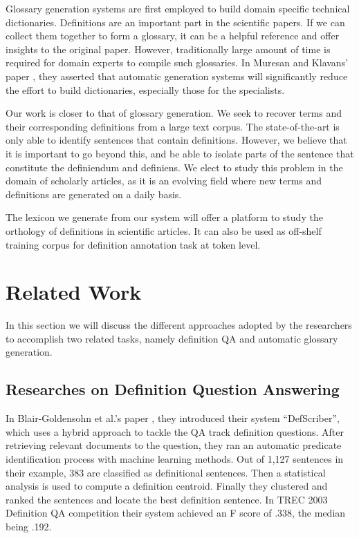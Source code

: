 \documentclass[hyp]{socreport}
\begin{document}
Glossary generation systems are first employed to build domain specific technical dictionaries. Definitions are an important part in the scientific papers. If we can collect them together to form a glossary, it can be a helpful reference and offer insights to the original paper. However, traditionally large amount of time is required for domain experts to compile such glossaries.  In Muresan and Klavans' paper \cite{Muresan02amethod}, they asserted that automatic generation systems will significantly reduce the effort to build dictionaries, especially those for the specialists.

Our work is closer to that of glossary generation. We seek to recover terms and their corresponding definitions from a large text corpus. The state-of-the-art is only able to identify sentences that contain definitions. However, we believe that it is important to go beyond this, and be able to isolate parts of the sentence that constitute the definiendum and definiens. We elect to study this problem in the domain of scholarly articles, as it is an evolving field where new terms and definitions are generated on a daily basis.

The lexicon we generate from our system will offer a platform to study the orthology of definitions in scientific articles. It can also be used as off-shelf training corpus for definition annotation task at token level. 

\chapter{Related Work}

In this section we will discuss the different approaches adopted by the researchers to accomplish two related tasks, namely definition QA and automatic glossary generation.

\section{Researches on Definition Question Answering}

In Blair-Goldensohn et al.'s paper \cite{Blair-goldensohn03ahybrid}, they introduced their system ``DefScriber'', which uses a hybrid approach to tackle the QA track definition questions. After retrieving relevant documents to the question, they ran an automatic predicate identification process with machine learning methods. Out of 1,127 sentences in their example, 383 are classified as definitional sentences. Then a statistical analysis is used to compute a definition centroid. Finally they clustered and ranked the sentences and locate the best definition sentence. In TREC 2003 Definition QA competition their system achieved an F score of .338, the median being .192.
\end{document}
